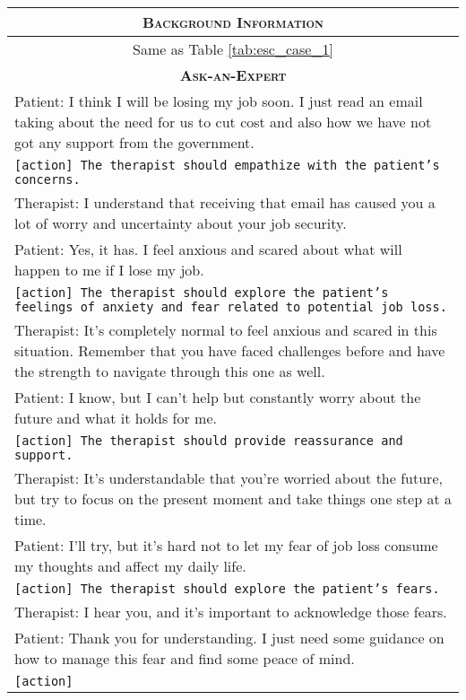 \begin{table}[]
    \centering
    \begin{tabular}{p{13.5cm}}
    \toprule
    \multicolumn{1}{c}{\textsc{\textbf{Background Information}}}\\
    \midrule
    \multicolumn{1}{c}{Same as Table \ref{tab:esc_case_1}}\\
    \midrule
    \midrule
    \multicolumn{1}{c}{\textsc{\textbf{Ask-an-Expert}}}\\
    \midrule
    Patient: I think I will be losing my job soon. I just read an email taking about the need for us to cut cost and also how we have not got any support from the government.\\
    \texttt{[action] The therapist should empathize with the patient's concerns.}\\
    Therapist: I understand that receiving that email has caused you a lot of worry and uncertainty about your job security.\\
    Patient: Yes, it has. I feel anxious and scared about what will happen to me if I lose my job.\\
    \texttt{[action] The therapist should explore the patient's feelings of anxiety and fear related to potential job loss.}\\
    Therapist: It's completely normal to feel anxious and scared in this situation. Remember that you have faced challenges before and have the strength to navigate through this one as well.\\
    Patient: I know, but I can't help but constantly worry about the future and what it holds for me.\\
    \texttt{[action] The therapist should provide reassurance and support.}\\
    Therapist: It's understandable that you're worried about the future, but try to focus on the present moment and take things one step at a time.\\
    Patient: I'll try, but it's hard not to let my fear of job loss consume my thoughts and affect my daily life.\\
    \texttt{[action] The therapist should explore the patient's fears.}\\
    Therapist: I hear you, and it's important to acknowledge those fears.\\
    Patient: Thank you for understanding. I just need some guidance on how to manage this fear and find some peace of mind. \\
    \texttt{[action] }\\

\end{tabular}
\end{table}
